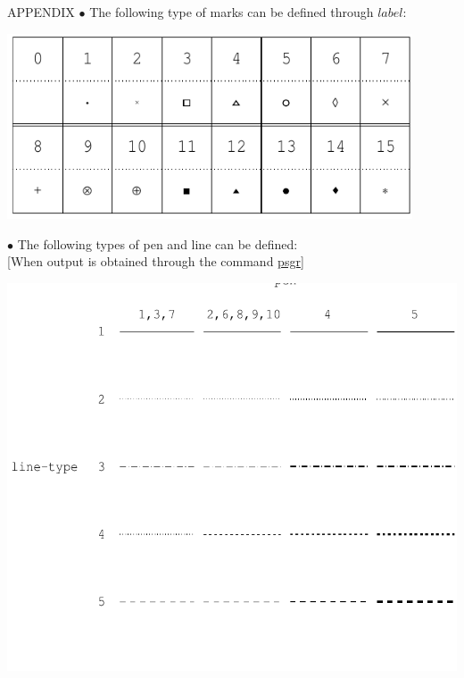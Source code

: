 \begin{qsection}{APPENDIX}
\hypertarget{lmark}{}
{\large \hspace{-1.5ex}$\bullet$
The following type of marks can be defined through $label$:}

\begin{center}
\leavevmode
\includegraphics[width=12cm]{fig/mark.pdf} \\
\end{center}

\hypertarget{pen-line}{}
{\large \hspace{-1.5ex}$\bullet$
The following types of pen and line can be defined:}\\
\hspace{3mm}[When output is obtained through the command \hyperlink{psgr}{psgr}]

\leavevmode
\includegraphics{fig/pen-line.pdf} \\


\end{qsection}
